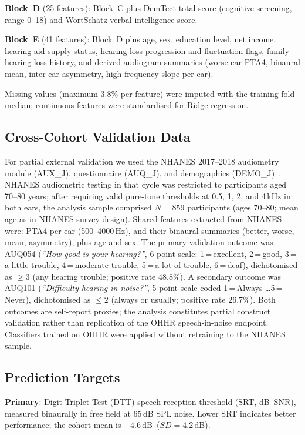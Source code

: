 \documentclass[conference]{IEEEtran}
\begin{document}
\textbf{Block~D} (25 features): Block~C plus DemTect total score (cognitive
screening, range 0--18) and WortSchatz verbal intelligence score.

\textbf{Block~E} (41 features): Block~D plus age, sex, education level,
net income, hearing aid supply status, hearing loss progression and
fluctuation flags, family hearing loss history, and derived audiogram
summaries (worse-ear PTA4, binaural mean, inter-ear asymmetry, high-frequency
slope per ear).

Missing values (maximum 3.8\% per feature) were imputed with the training-fold
median; continuous features were standardised for Ridge regression.

\subsection{Cross-Cohort Validation Data}
\label{subsec:nhanes}

For partial external validation we used the NHANES 2017--2018 audiometry
module (AUX\_J), questionnaire (AUQ\_J), and demographics
(DEMO\_J)~\cite{NHANES2018}.
NHANES audiometric testing in that cycle was restricted to participants aged
70--80 years; after requiring valid pure-tone thresholds at 0.5, 1, 2, and
4\,kHz in both ears, the analysis sample comprised \textbf{$N=859$}
participants (ages 70--80; mean age as in NHANES survey design).  Shared
features extracted from NHANES were: PTA4 per ear (500--4000\,Hz), and their
binaural summaries (better, worse, mean, asymmetry), plus age and sex.
The primary validation outcome was AUQ054 (\textit{``How good is your
hearing?''}, 6-point scale: 1\,=\,excellent, 2\,=\,good, 3\,=\,a little
trouble, 4\,=\,moderate trouble, 5\,=\,a lot of trouble, 6\,=\,deaf),
dichotomised as $\geq 3$ (any hearing trouble; positive rate 48.8\%).
A secondary outcome was AUQ101
(\textit{``Difficulty hearing in noise?''}, 5-point scale coded
1\,=\,Always \ldots 5\,=\,Never), dichotomised as $\leq 2$ (always or usually;
positive rate 26.7\%).  Both outcomes are self-report proxies; the analysis
constitutes partial construct validation rather than replication of the OHHR
speech-in-noise endpoint.  Classifiers trained on OHHR were applied without
retraining to the NHANES sample.

\subsection{Prediction Targets}

\textbf{Primary}: Digit Triplet Test (DTT) speech-reception threshold
(SRT, dB~SNR), measured binaurally in free field at 65\,dB SPL noise.
Lower SRT indicates better performance; the cohort mean is
$-4.6$\,dB~($SD=4.2$\,dB).
\end{document}
